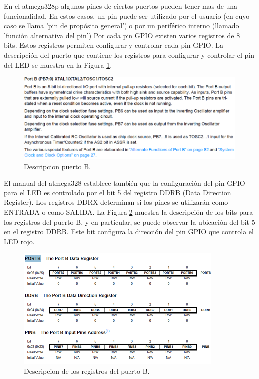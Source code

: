 \documentclass[12pt]{article}
\begin{document}
En el atmega328p algunos pines de ciertos puertos pueden tener mas de 
una funcionalidad. En estos casos, un pin puede ser utilizado por el usuario
(en cuyo caso se llama 'pin de propósito general') o por un periférico interno (llamado 'función alternativa del pin')
Por cada pin GPIO 
existen varios registros de 8 bits. 
Estos registros permiten configurar y controlar cada pin GPIO.
La descripción del puerto que contiene los registros
para configurar y controlar el pin del LED se muestra en la Figura \ref{fig:puertob}. 



\begin{figure}
\includegraphics[width=\linewidth]{descripcion-registro.png}
\caption{Descripcion puerto B.}
\label{fig:puertob}
\end{figure}



El manual del atmega328 establece también que la configuración del pin GPIO para el
LED es controlado por el bit 5 del registro DDRB (Data Direction Register).
Los registros DDRX determinan si los pines se utilizarán como ENTRADA
o como SALIDA.
La Figura \ref{fig:regpuertob} muestra la descripción de los bits 
para los registros del puerto B, y en particular, se puede observar la ubicación del bit 5 en el registro DDRB. Este
bit configura la dirección del pin GPIO que controla el LED rojo.

\begin{figure}
\includegraphics[width=\linewidth]{portb-ddrb.png}
\caption{Descripcion de los registros del puerto B.}
\label{fig:regpuertob}
\end{figure}
\end{document}
